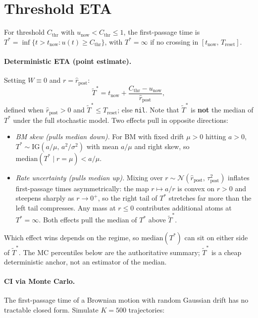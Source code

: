 \documentclass[11pt]{article}
\newcommand{\rpost}{\hat r_{\text{post}}}
\newcommand{\taupostsq}{\tau_{\text{post}}^2}
\newcommand{\unow}{u_{\text{now}}}
\newcommand{\tnow}{t_{\text{now}}}
\newcommand{\Treset}{T_{\text{reset}}}
\newcommand{\Cthr}{C_{\text{thr}}}
\newcommand{\Tstar}{T^\ast}
\begin{document}
\section{Threshold ETA}

For threshold $\Cthr$ with $\unow < \Cthr \leq 1$, the first-passage time is
$\Tstar = \inf\{t > \tnow : u(t) \geq \Cthr\}$, with $\Tstar = \infty$ if no
crossing in $[\tnow,\, \Treset]$.

\paragraph{Deterministic ETA (point estimate).} Setting $W \equiv 0$ and $r
= \rpost$:
\[
  \tilde\Tstar = \tnow + \frac{\Cthr - \unow}{\rpost},
\]
defined when $\rpost > 0$ and $\tilde\Tstar \leq \Treset$; else
\texttt{nil}. Note that $\tilde\Tstar$ is \textbf{not} the median of
$\Tstar$ under the full stochastic model. Two effects pull in opposite
directions:

\begin{itemize}
  \item \emph{BM skew (pulls median down).} For BM with fixed drift $\mu > 0$
    hitting $a > 0$, $\Tstar \sim \mathrm{IG}(a/\mu,\, a^2/\sigma^2)$ with
    mean $a/\mu$ and right skew, so $\mathrm{median}(\Tstar \mid r{=}\mu) <
    a/\mu$.
  \item \emph{Rate uncertainty (pulls median up).} Mixing over $r \sim
    \mathcal{N}(\rpost,\, \taupostsq)$ inflates first-passage times
    asymmetrically: the map $r \mapsto a/r$ is convex on $r > 0$ and
    steepens sharply as $r \to 0^+$, so the right tail of $\Tstar$
    stretches far more than the left tail compresses. Any mass at $r \leq
    0$ contributes additional atoms at $\Tstar = \infty$. Both effects pull
    the median of $\Tstar$ above $\tilde\Tstar$.
\end{itemize}

Which effect wins depends on the regime, so $\mathrm{median}(\Tstar)$ can
sit on either side of $\tilde\Tstar$. The MC percentiles below are the
authoritative summary; $\tilde\Tstar$ is a cheap deterministic anchor, not
an estimator of the median.

\paragraph{CI via Monte Carlo.} The first-passage time of a Brownian motion
with random Gaussian drift has no tractable closed form. Simulate $K = 500$
trajectories:
\end{document}
